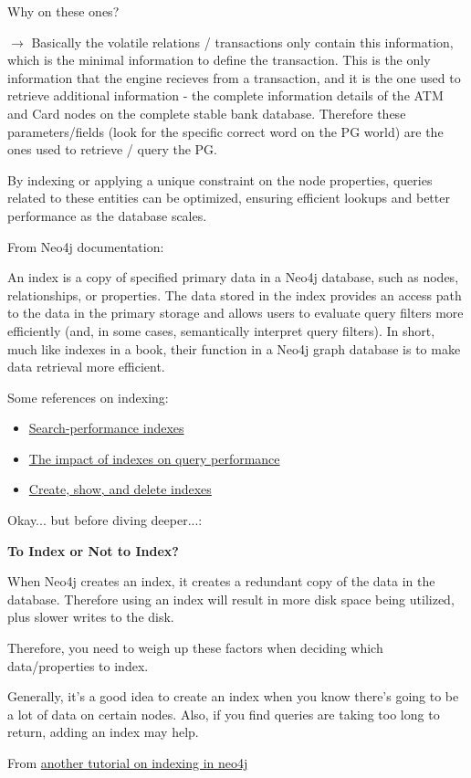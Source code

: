 \documentclass{article}
\begin{document}
Why on these ones?

$\rightarrow$ Basically the volatile relations / transactions only contain this information,
which is the minimal information to define the transaction. This is the only information that
the engine recieves from a transaction, and it is the one used to retrieve additional information - the complete information details of the ATM and Card nodes on the complete
stable bank database. Therefore these parameters/fields (look for the specific correct
word on the PG world) are the ones used to retrieve / query the PG. 

By indexing or applying a unique constraint on the node properties, queries related to these entities can be optimized, ensuring efficient lookups and better performance as the database scales.

From Neo4j documentation:
\begin{tcolorbox}
  An index is a copy of specified primary data in a Neo4j database, such as nodes, relationships, or properties. The data stored in the index provides an access path to the data in the primary storage and allows users to evaluate query filters more efficiently (and, in some cases, semantically interpret query filters). In short, much like indexes in a book, their function in a Neo4j graph database is to make data retrieval more efficient.
\end{tcolorbox}

Some references on indexing:
\begin{itemize}
  \item \href{https://neo4j.com/docs/cypher-manual/current/indexes/search-performance-indexes/overview/}{Search-performance indexes}
  \item \href{https://neo4j.com/docs/cypher-manual/current/indexes/search-performance-indexes/using-indexes/}{The impact of indexes on query performance}
  \item \href{https://neo4j.com/docs/cypher-manual/current/indexes/search-performance-indexes/managing-indexes/}{Create, show, and delete indexes}
\end{itemize}

Okay... but before diving deeper...:

\textbf{To Index or Not to Index?}
\begin{tcolorbox}
When Neo4j creates an index, it creates a redundant copy of the data in the database. Therefore using an index will result in more disk space being utilized, plus slower writes to the disk.

Therefore, you need to weigh up these factors when deciding which data/properties to index.

Generally, it's a good idea to create an index when you know there's going to be a lot of data on certain nodes. Also, if you find queries are taking too long to return, adding an index may help.
\end{tcolorbox}

From \href{https://www.quackit.com/neo4j/tutorial/neo4j_create_an_index_using_cypher.cfm#google_vignette}{another tutorial on indexing in neo4j}
\end{document}
